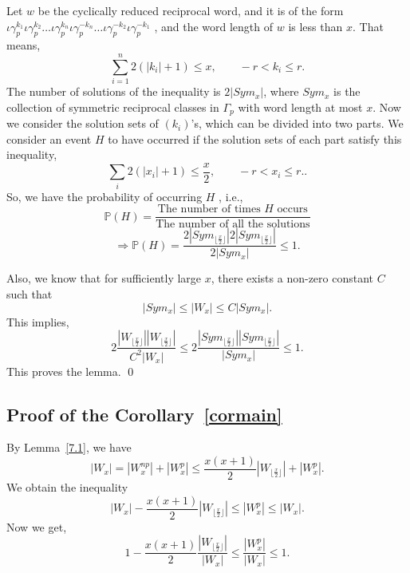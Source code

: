 \documentclass[11pt]{amsart}
\renewenvironment{proof}{{\bfseries Proof.}}{\qed}
\numberwithin{equation}{section}
\newcommand{\imp}{\Rightarrow}
\newcommand{\g}{\gamma_{p}}
\newcommand{\io}{\iota }
\newcommand{\lemref}[1]{Lemma~\ref{#1}}
\newcommand{\corref}[1]{Corollary~\ref{#1}}
\numberwithin{equation}{section}
\begin{document}
	          \begin{proof}
	          Let $w$ be the cyclically reduced reciprocal word, and it is of the form\\ $ \io\g^{k_{1}}\io \g^{k_{2}}\dots \io \g^{k_{n}}\io \g^{-k_{n}}\dots\io \g^{-k_{2}}\io \g^{-k_{1}} $ , and the word length of $w$ is less than $x.$  That means,
	          \[\sum_{i=1}^{n}2\left(\left|k_{i}\right|+1\right)\leq x,\qquad -r<k_{i}\leq r.\]
	          The number of solutions of the inequality is $2\left|Sym_{x}\right|$, where $Sym_{x}$ is the collection of symmetric reciprocal classes in $\Gamma_{p}$ with word length at most $x$. 
	          Now we consider the solution sets of $(k_{i})$'s, which can be divided into two parts.
	          We consider an event $H$ to have occurred if the solution sets of each part satisfy this inequality,
	          \[\sum_{i}2(\left|x_{i}\right|+1)\leq \frac{x}{2},\qquad -r<x_{i}\leq r..\]
	          So, we have the probability of occurring $H$ , i.e.,
	          \[\mathbb{P}(H)= \frac{\text{The number of times $H$ occurs}}{\text{The number of all the solutions}}\]
	          \[\imp \mathbb{P}(H)=\frac{2\left|Sym_{\lfloor\frac{x}{2}\rfloor}\right| 2\left|Sym_{\lfloor\frac{x}{2}\rfloor}\right|}{2\left|Sym_{x}\right|}\leq 1.\]
	        
	          Also, we know that for sufficiently large $x$, there exists a non-zero constant $C$ such that $$\left|Sym_x\right|\leq \left|W_{x}\right|\leq C \left|Sym_{x}\right|.$$
	         This implies,
	       \[2\frac{\left|W_{\lfloor\frac{x}{2}\rfloor}\right|\left|W_{\lfloor\frac{x}{2}\rfloor}\right|}{C^2\left|W_{x}\right|}\leq 2\frac{\left|Sym_{\lfloor\frac{x}{2}\rfloor}\right|\left|Sym_{\lfloor\frac{x}{2}\rfloor}\right|}{\left|Sym_{x}\right|}\leq 1.\]
	          This proves the lemma.
	          \end{proof} 
	          
	          
	          \medskip
	          \subsection{Proof of the \corref{cormain}} 
	          By \lemref{7.1}, we have
	          \[
	          |W_{x}| = |W^{np}_{x}| + |W^{p}_{x}| \leq\frac{x(x+1)}{2}\left|W_{\lfloor\frac{x}{2}\rfloor}\right|+|W^{p}_{x}|.
	          \]
	          We obtain the inequality
	          \[
	          |W_{x}| - \frac{x(x+1)}{2}\left|W_{\lfloor\frac{x}{2}\rfloor}\right|\leq|W^{p}_{x}| \leq|W_{x}|.
	          \]
	          Now we get,
	          \[
	          1 - \frac{x(x+1)}{2}\frac{\left|W_{\lfloor\frac{x}{2}\rfloor}\right|}{\left|W_{x}\right|}
	          \leq \frac{|W^{p}_{x}|}{|W_{x}|} \leq 1.
	          \]
	          
\end{document}

